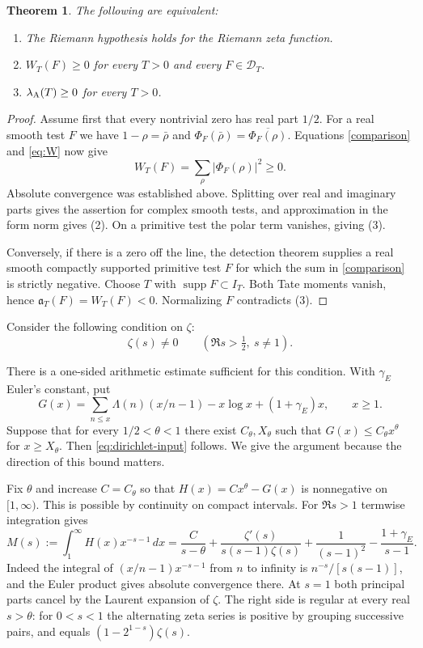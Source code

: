 \documentclass[11pt]{amsart}
\newtheorem{theorem}{Theorem}[section]
\theoremstyle{definition}
\theoremstyle{remark}
\newcommand{\supp}{\operatorname{supp}}
\begin{document}
\begin{theorem}
The following are equivalent:
\begin{enumerate}
\item The Riemann hypothesis holds for the Riemann zeta function.
\item $W_T(F)\ge0$ for every $T>0$ and every $F\in\mathcal D_T$.
\item $\lambda_{\rm A}(T)\ge0$ for every $T>0$.
\end{enumerate}
\end{theorem}
\begin{proof}
Assume first that every nontrivial zero has real part $1/2$. For a real
smooth test $F$ we have $1-\rho=\bar\rho$ and
$\Phi_F(\bar\rho)=\overline{\Phi_F(\rho)}$. Equations \eqref{comparison}
and \eqref{eq:W} now give
\[
 W_T(F)=\sum_\rho|\Phi_F(\rho)|^2\ge0.
\]
Absolute convergence was established above. Splitting over real and
imaginary parts gives the assertion for complex smooth tests, and
approximation in the form norm gives (2). On a primitive test the polar
term vanishes, giving (3).

Conversely, if there is a zero off the line, the detection theorem \cite[Theorem~F]{Paper45} supplies a real smooth compactly
supported primitive test $F$ for which the sum in \eqref{comparison} is
strictly negative. Choose $T$ with $\supp F\subset I_T$. Both Tate moments
vanish, hence $\mathfrak a_T(F)=W_T(F)<0$. Normalizing $F$ contradicts (3).
\end{proof}

Consider the following condition on $\zeta$:
\begin{equation}\label{eq:dirichlet-input}
 \zeta(s)\ne0\qquad (\Re s>\tfrac12,\ s\ne1).
\end{equation}

There is a one-sided arithmetic estimate sufficient for this condition.
With $\gamma_E$ Euler's constant, put
\[
 G(x)=\sum_{n\le x}\Lambda(n)(x/n-1)-x\log x+(1+\gamma_E)x,
 \qquad x\ge1.
\]
Suppose that for every $1/2<\theta<1$ there exist $C_\theta,X_\theta$
such that $G(x)\le C_\theta x^\theta$ for $x\ge X_\theta$.
Then \eqref{eq:dirichlet-input} follows. We give the argument because
the direction of this bound matters.

Fix $\theta$ and increase $C=C_\theta$ so that $H(x)=Cx^\theta-G(x)$
is nonnegative on $[1,\infty)$. This is possible by continuity on
compact intervals. For $\Re s>1$ termwise integration gives
\[
 M(s):=\int_1^\infty H(x)x^{-s-1}\,dx
 =\frac C{s-\theta}
 +\frac{\zeta'(s)}{s(s-1)\zeta(s)}
 +\frac1{(s-1)^2}-\frac{1+\gamma_E}{s-1}.
\]
Indeed the integral of $(x/n-1)x^{-s-1}$ from $n$ to infinity is
$n^{-s}/[s(s-1)]$, and the Euler product gives absolute convergence
there. At $s=1$ both principal parts cancel by the Laurent expansion
of $\zeta$. The right side is regular at every real $s>\theta$:
for $0<s<1$ the alternating zeta series is positive by grouping
successive pairs, and equals $(1-2^{1-s})\zeta(s)$.
\end{document}
